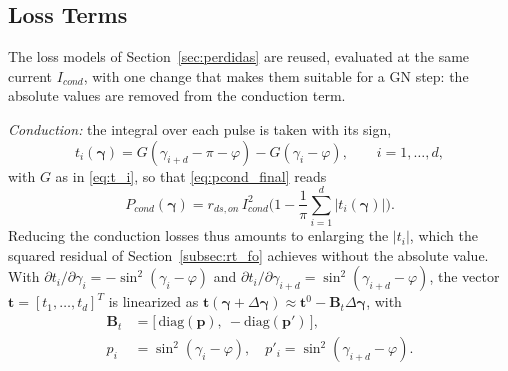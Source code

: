\documentclass[conference]{IEEEtran}
\newcommand{\gv}{\boldsymbol{\gamma}}
\newcommand{\old}[1]{\par\smallskip\noindent{\color{gray}\footnotesize
    \textbf{[ANTES]} #1}\par\smallskip}
\renewcommand{\old}[1]{}       %
\begin{document}
\subsection{Loss Terms}
\label{subsec:rt_loss}

The loss models of Section~\ref{sec:perdidas} are reused, evaluated at the
same current $I_{cond}$, with one change that makes them suitable for a GN
step: the absolute values are removed from the conduction term.
\old{The loss models of Section~\ref{sec:perdidas} are reused, evaluated at
the rated current $I_{nom}$, with two changes that make them suitable for a
GN step: the absolute values are removed from the conduction term, and the
switched current is taken in magnitude in the switching term.}

\textit{Conduction:} the integral over each pulse is taken with its sign,
%
\begin{equation}
  t_i(\gv) = G(\gamma_{i+d}-\pi-\varphi) - G(\gamma_i-\varphi),
  \qquad i = 1,\dots,d,
  \label{eq:rt_T}
\end{equation}
%
with $G$ as in \eqref{eq:t_i}, so that \eqref{eq:pcond_final} reads
%
\begin{equation}
  P_{cond}(\gv) = r_{ds,on}\,I_{cond}^2
  \Big(1 - \frac{1}{\pi}\sum_{i=1}^{d} |t_i(\gv)|\Big).
  \label{eq:rt_pcond}
\end{equation}
%
Reducing the conduction losses thus amounts to enlarging the $|t_i|$,
which the squared residual of Section~\ref{subsec:rt_fo} achieves without
the absolute value. With
$\partial t_i/\partial\gamma_i = -\sin^2(\gamma_i-\varphi)$ and
$\partial t_i/\partial\gamma_{i+d} = \sin^2(\gamma_{i+d}-\varphi)$, the
vector $\mathbf{t} = [t_1,\dots,t_d]^T$ is linearized as
$\mathbf{t}(\gv+\Delta\gv) \approx \mathbf{t}^0 - \mathbf{B}_t\Delta\gv$,
with
%
\begin{align}
  \mathbf{B}_t &= \big[\,\mathrm{diag}(\mathbf{p}),\
                  -\mathrm{diag}(\mathbf{p}')\,\big], \nonumber\\
  p_i &= \sin^2(\gamma_i-\varphi), \quad
  p'_i = \sin^2(\gamma_{i+d}-\varphi).
  \label{eq:rt_BP}
\end{align}
\end{document}
